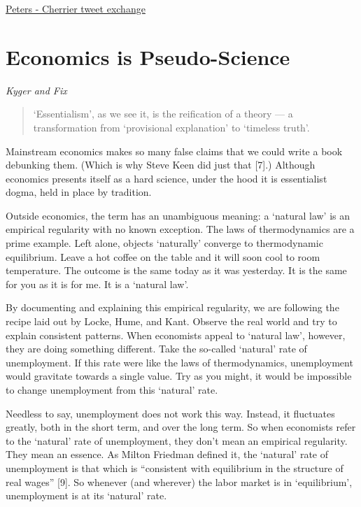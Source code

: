 \documentclass[
]{book}
\begin{document}
\href{https://twitter.com/Undercoverhist/status/1545446586024591361}{Peters - Cherrier tweet exchange}

\hypertarget{economics-is-pseudo-science}{%
\section{Economics is Pseudo-Science}\label{economics-is-pseudo-science}}

\emph{Kyger and Fix}

\begin{quote}
`Essentialism', as we see it, is the reification of a theory --- a transformation from `provisional explanation' to `timeless truth'.
\end{quote}

Mainstream economics makes so many false claims that we could write a book debunking them. (Which is why Steve Keen did just that {[}7{]}.) Although economics presents itself as a hard science, under the hood it is essentialist dogma, held in place by tradition.

Outside economics, the term has an unambiguous meaning: a `natural law' is an empirical regularity with no known exception. The laws of thermodynamics are a prime example. Left alone, objects `naturally' converge to thermodynamic equilibrium. Leave a hot coffee on the table and it will soon cool to room temperature. The outcome is the same today as it was yesterday. It is the same for you as it is for me. It is a `natural law'.

By documenting and explaining this empirical regularity, we are following the recipe laid out by Locke, Hume, and Kant. Observe the real world and try to explain consistent patterns. When economists appeal to `natural law', however, they are doing something different. Take the so-called `natural' rate of unemployment. If this rate were like the laws of thermodynamics, unemployment would gravitate towards a single value. Try as you might, it would be impossible to change unemployment from this `natural' rate.

Needless to say, unemployment does not work this way. Instead, it fluctuates greatly, both in the short term, and over the long term. So when economists refer to the `natural' rate of unemployment, they don't mean an empirical regularity. They mean an essence. As Milton Friedman defined it, the `natural' rate of unemployment is that which is ``consistent with equilibrium in the structure of real wages'' {[}9{]}. So whenever (and wherever) the labor market is in `equilibrium', unemployment is at its `natural' rate.
\end{document}
